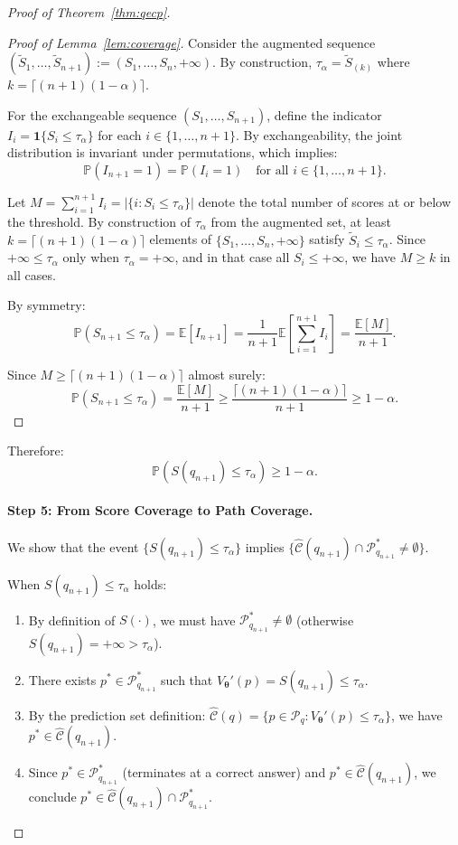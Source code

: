 \documentclass{article}
\theoremstyle{plain}
\theoremstyle{definition}
\theoremstyle{remark}
\begin{document}
\begin{proof}[Proof of Theorem~\ref{thm:qecp}]
\begin{proof}[Proof of Lemma~\ref{lem:coverage}]
Consider the augmented sequence $(\tilde{S}_1, \ldots, \tilde{S}_{n+1}) := (S_1, \ldots, S_n, +\infty)$. By construction, $\tau_\alpha = \tilde{S}_{(k)}$ where $k = \lceil (n+1)(1-\alpha) \rceil$.

For the exchangeable sequence $(S_1, \ldots, S_{n+1})$, define the indicator $I_i = \mathbf{1}\{S_i \le \tau_\alpha\}$ for each $i \in \{1, \ldots, n+1\}$. By exchangeability, the joint distribution is invariant under permutations, which implies:
\[
\mathbb{P}(I_{n+1} = 1) = \mathbb{P}(I_i = 1) \quad \text{for all } i \in \{1, \ldots, n+1\}.
\]

Let $M = \sum_{i=1}^{n+1} I_i = |\{i : S_i \le \tau_\alpha\}|$ denote the total number of scores at or below the threshold. By construction of $\tau_\alpha$ from the augmented set, at least $k = \lceil (n+1)(1-\alpha) \rceil$ elements of $\{S_1, \ldots, S_n, +\infty\}$ satisfy $\tilde{S}_i \le \tau_\alpha$. Since $+\infty \le \tau_\alpha$ only when $\tau_\alpha = +\infty$, and in that case all $S_i \le +\infty$, we have $M \ge k$ in all cases.

By symmetry:
\[
\mathbb{P}(S_{n+1} \le \tau_\alpha) = \mathbb{E}[I_{n+1}] = \frac{1}{n+1} \mathbb{E}\left[\sum_{i=1}^{n+1} I_i\right] = \frac{\mathbb{E}[M]}{n+1}.
\]

Since $M \ge \lceil (n+1)(1-\alpha) \rceil$ almost surely:
\[
\mathbb{P}(S_{n+1} \le \tau_\alpha) = \frac{\mathbb{E}[M]}{n+1} \ge \frac{\lceil (n+1)(1-\alpha) \rceil}{n+1} \ge 1 - \alpha.
\]
\end{proof}

Therefore:
\begin{equation}
\mathbb{P}(S(q_{n+1}) \le \tau_\alpha) \ge 1-\alpha.
\label{eq:score_coverage}
\end{equation}

\paragraph{Step 5: From Score Coverage to Path Coverage.}
We show that the event $\{S(q_{n+1}) \le \tau_\alpha\}$ implies $\{\hat{\mathcal{C}}(q_{n+1}) \cap \mathcal{P}^*_{q_{n+1}} \neq \emptyset\}$.

When $S(q_{n+1}) \le \tau_\alpha$ holds:
\begin{enumerate}
    \item By definition of $S(\cdot)$, we must have $\mathcal{P}^*_{q_{n+1}} \neq \emptyset$ (otherwise $S(q_{n+1}) = +\infty > \tau_\alpha$).
    \item There exists $p^* \in \mathcal{P}^*_{q_{n+1}}$ such that $V_{\bm\theta}'(p) = S(q_{n+1}) \le \tau_\alpha$.
    \item By the prediction set definition: $\hat{\mathcal{C}}(q) = \{p \in \mathcal{P}_q : V_{\bm\theta}'(p) \le \tau_\alpha\}$, we have $p^* \in \hat{\mathcal{C}}(q_{n+1})$.
    \item Since $p^* \in \mathcal{P}^*_{q_{n+1}}$ (terminates at a correct answer) and $p^* \in \hat{\mathcal{C}}(q_{n+1})$, we conclude $p^* \in \hat{\mathcal{C}}(q_{n+1}) \cap \mathcal{P}^*_{q_{n+1}}$.
\end{enumerate}


\end{proof}
\end{document}
